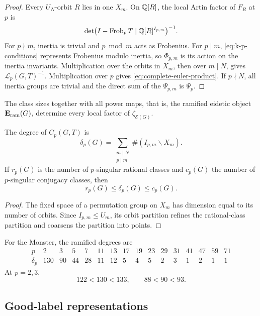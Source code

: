 \begin{proof}
Every \(U_N\)-orbit \(R\) lies in one \(X_m\).  On
\(\mathbb Q[R]\), the local Artin factor of \(F_R\) at \(p\) is
\[
 \det\bigl(I-\operatorname{Frob}_pT
 \mid\mathbb Q[R]^{I_{p,m}}\bigr)^{-1}.
\]
For \(p\nmid m\), inertia is trivial and \(p\bmod m\) acts as Frobenius.
For \(p\mid m\), \eqref{eq:k-p-conditions} represents Frobenius modulo
inertia, so \(\Phi_{p,m}\) is its action on the inertia invariants.
Multiplication over the orbits in \(X_m\), then over \(m\mid N\), gives
\(\mathcal L_p(G,T)^{-1}\).  Multiplication over \(p\) gives
\eqref{eq:complete-euler-product}.  If \(p\nmid N\), all inertia groups
are trivial and the direct sum of the \(\Psi_{p,m}\) is \(\Psi_p\).
\end{proof}

\begin{corollary}
\label{cor:complete-euler-product}
The class sizes together with all power maps, that is, the ramified eidetic
object \(\mathbf E_{\mathrm{ram}}(G)\), determine every local factor
of \(\zeta_{\mathcal E(G)}\).
\end{corollary}

\begin{corollary}
\label{cor:ramified-degree}
The degree of \(C_p(G,T)\) is
\[
 \delta_p(G)=
 \sum_{\substack{m\mid N\\p\mid m}}
 \#(I_{p,m}\backslash X_m).
\]
If \(r_p(G)\) is the number of \(p\)-singular rational classes and
\(c_p(G)\) the number of \(p\)-singular conjugacy classes, then
\[
 r_p(G)\leq\delta_p(G)\leq c_p(G).
\]
\end{corollary}

\begin{proof}
The fixed space of a permutation group on \(X_m\) has dimension equal to
its number of orbits.  Since \(I_{p,m}\leq U_m\), its orbit partition
refines the rational-class partition and coarsens the partition into
points.
\end{proof}

For the Monster, the ramified degrees are
\[
\begin{array}{c|rrrrrrrrrrrrrrr}
p&2&3&5&7&11&13&17&19&23&29&31&41&47&59&71\\
\hline
\delta_p&
130&90&44&28&11&12&5&4&5&2&3&1&2&1&1
\end{array}
\]
At \(p=2,3\),
\[
 122<130<133,\qquad 88<90<93.
\]

\subsection{Good-label representations}

